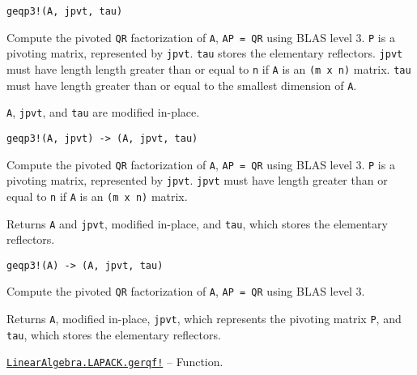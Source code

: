 \begin{adjustwidth}{2em}{0pt}


\begin{verbatim}
geqp3!(A, jpvt, tau)
\end{verbatim}

Compute the pivoted \texttt{QR} factorization of \texttt{A}, \texttt{AP = QR} using BLAS level 3. \texttt{P} is a pivoting matrix, represented by \texttt{jpvt}. \texttt{tau} stores the elementary reflectors. \texttt{jpvt} must have length length greater than or equal to \texttt{n} if \texttt{A} is an \texttt{(m x n)} matrix. \texttt{tau} must have length greater than or equal to the smallest dimension of \texttt{A}.

\texttt{A}, \texttt{jpvt}, and \texttt{tau} are modified in-place.




\begin{lstlisting}
geqp3!(A, jpvt) -> (A, jpvt, tau)
\end{lstlisting}

Compute the pivoted \texttt{QR} factorization of \texttt{A}, \texttt{AP = QR} using BLAS level 3. \texttt{P} is a pivoting matrix, represented by \texttt{jpvt}. \texttt{jpvt} must have length greater than or equal to \texttt{n} if \texttt{A} is an \texttt{(m x n)} matrix.

Returns \texttt{A} and \texttt{jpvt}, modified in-place, and \texttt{tau}, which stores the elementary reflectors.




\begin{lstlisting}
geqp3!(A) -> (A, jpvt, tau)
\end{lstlisting}

Compute the pivoted \texttt{QR} factorization of \texttt{A}, \texttt{AP = QR} using BLAS level 3.

Returns \texttt{A}, modified in-place, \texttt{jpvt}, which represents the pivoting matrix \texttt{P}, and \texttt{tau}, which stores the elementary reflectors.



\end{adjustwidth}
\hypertarget{1345086231036394133}{} 
\hyperlink{1345086231036394133}{\texttt{LinearAlgebra.LAPACK.gerqf!}}  -- {Function.}

